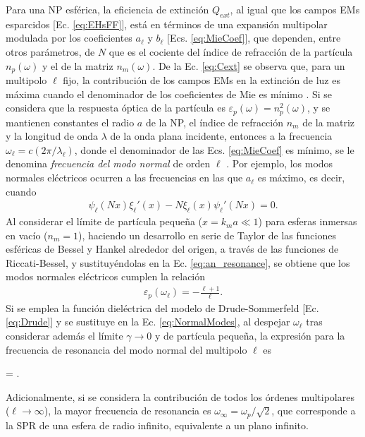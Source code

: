 Para una NP esférica, la eficiencia de extinción $Q_{ext}$, al igual que los campos EMs esparcidos [Ec. \eqref{eq:EHsFF}],  está en términos de una expansión multipolar modulada por los coeficientes $a_\ell$ y $b_\ell$ [Ecs.  \eqref{eq:MieCoef}], que dependen, entre otros parámetros, de $N$ que es el cociente del índice de refracción de la partícula $n_p(\omega)$ y el de la matriz $n_m(\omega)$.  De la Ec.  \eqref{eq:Cext} se observa que, para un multipolo $\ell$ fijo, la contribución de los campos EMs en la extinción de luz es máxima  cuando  el denominador de los coeficientes de Mie es mínimo \cite{novotny2006principles,maier2007plasmonics}.  Si se considera que la respuesta óptica de la partícula es 	$\varepsilon_p (\omega) = n_p^2 (\omega)$, y se mantienen constantes el radio $a$ de la NP, el índice de refracción $n_m$ de la matriz y la longitud de onda $\lambda$ de la onda plana incidente, entonces a la frecuencia $\omega_\ell = c (2\pi / \lambda_\ell)$, donde el denominador de las Ecs.  \eqref{eq:MieCoef} es mínimo, se le denomina \emph{frecuencia del modo normal} de orden $\ell$ \cite{bohren1998absorption,maciel2017momentum}. Por ejemplo, los modos normales eléctricos ocurren a las frecuencias en las que $a_\ell$ es máximo, es decir, cuando 
%
	\begin{align}
	\psi_\ell(Nx)\xi_\ell'(x)-N\xi_\ell(x)\psi_\ell'(Nx) = 0. 
	\label{eq:an_resonance}
	\end{align}
%
Al considerar el límite de partícula pequeña ($x = k_m a\ll 1$) para esferas inmersas en vacío ($n_m=1$), haciendo un desarrollo en serie de Taylor de las funciones esféricas de Bessel y Hankel alrededor del origen, a través de las funciones de Riccati-Bessel, y sustituyéndolas en la Ec.  \eqref{eq:an_resonance}, se obtiene que los modos normales eléctricos cumplen la relación \cite{maciel2017momentum}
%
	\begin{align}
	\varepsilon_p(\omega_\ell) = - \frac{\ell+1}{\ell}.  
	\label{eq:NormalModes}
	\end{align}
%
Si se emplea la función dieléctrica del modelo de Drude-Sommerfeld [Ec.  \eqref{eq:Drude}] y se sustituye en la Ec.  \eqref{eq:NormalModes}, al despejar $\omega_\ell$ tras considerar además el límite $\gamma\to 0$ y de partícula pequeña, la expresión para la frecuencia de resonancia del  modo normal del multipolo $\ell$ es \cite{maciel2017momentum}\vspace*{-.75em}
%
\begin{tcolorbox}[title =Frecuencia de resonancia del LSP, ams align,  breakable ]
	 = . \label{eq:PPequeña}
	\end{tcolorbox}\vspace*{-.75em}\noindent
%
Adicionalmente, si se considera la contribución de todos los órdenes multipolares ($\ell\to \infty$), la mayor frecuencia de resonancia es $\omega_\infty = \omega_p/\sqrt{2}$, que corresponde a la SPR de una esfera de radio infinito, equivalente a un plano infinito.

